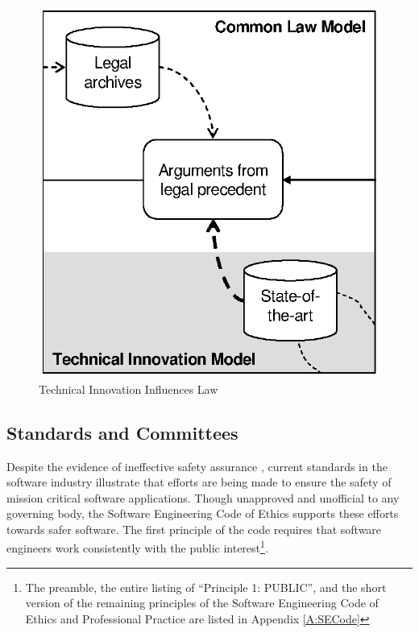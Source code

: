 \begin{figure}[t]
\begin{center}
\includegraphics{figures/TechOnLaw.eps}
\end{center}
\caption{Technical Innovation Influences Law}
\label{fig:TechOnLaw}
\end{figure}

\subsection{Standards and Committees}
Despite the evidence of ineffective safety assurance \cite{Therac25,Maisel05},
current standards in the software industry illustrate that efforts are being
made to ensure the safety of mission critical software applications. Though
unapproved and unofficial to any governing body, the Software Engineering Code
of Ethics supports these efforts towards safer software. The first principle of
the code requires that software engineers work consistently with the public
interest\footnote{The preamble, the entire listing of ``Principle 1: PUBLIC'',
and the short version of the remaining principles of the Software Engineering
Code of Ethics and Professional Practice are listed in Appendix \ref{A:SECode}}.

